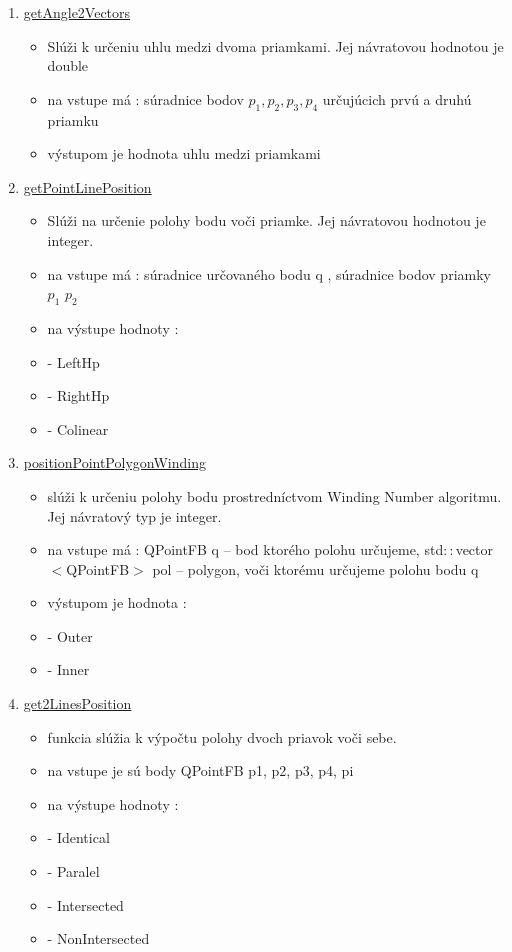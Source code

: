 \documentclass[12pt]{article}
\begin{document}
\begin{enumerate}
\item[] \underline{getAngle2Vectors}
\begin{itemize}
\item Slúži k určeniu uhlu medzi dvoma priamkami. Jej návratovou hodnotou je double
\item na vstupe má : súradnice bodov $p_1, p_2, p_3, p_4$ určujúcich prvú a druhú priamku
\item výstupom je hodnota uhlu medzi priamkami 
\end{itemize}

\item[] \underline{getPointLinePosition}
\begin{itemize}
\item Slúži na určenie polohy bodu voči priamke. Jej návratovou hodnotou je integer.
\item na vstupe má : súradnice určovaného bodu q , súradnice bodov priamky $p_1$ $p_2$
\item na výstupe hodnoty :
\item[] - LeftHp
\item[] - RightHp
\item[] - Colinear
\end{itemize}

\item[] \underline{positionPointPolygonWinding}
\begin{itemize}
\item slúži k určeniu polohy bodu prostredníctvom Winding Number algoritmu. Jej návratový typ je integer.
\item na vstupe má : QPointFB q – bod ktorého polohu určujeme, std$::$vector$<$QPointFB$>$ pol – polygon, voči ktorému určujeme polohu bodu q
\item výstupom je hodnota :
\item[] - Outer
\item[] - Inner
\end{itemize}

\item[] \underline{get2LinesPosition}
\begin{itemize}
\item funkcia slúžia k výpočtu polohy dvoch priavok voči sebe. 
\item na vstupe je sú body QPointFB p1, p2, p3, p4, pi
\item na výstupe hodnoty :
\item[] - Identical
\item[] - Paralel
\item[] - Intersected
\item[] - NonIntersected
\end{itemize}



\end{enumerate}
\end{document}
